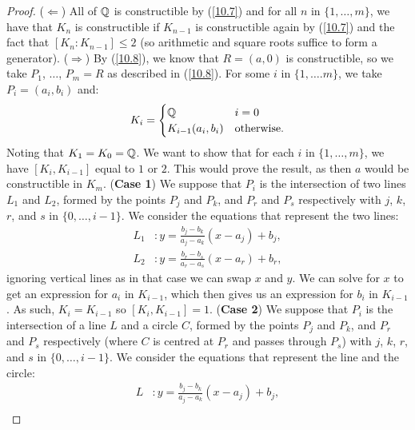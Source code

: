 \begin{proof}
    ($\Longleftarrow$) All of $\mathbb{Q}$ is constructible by (\ref{10.7}) and for all
    $n$ in $\{1, \ldots, m\}$, we have that $K_n$ is constructible if $K_{n - 1}$ is
    constructible again by (\ref{10.7}) and the fact that $[K_n : K_{n - 1}] \leq 2$
    (so arithmetic and square roots suffice to form a generator).
    \bs
    ($\Longrightarrow$) By (\ref{10.8}), we know that $R = (a, 0)$ is constructible,
    so we take $P_1$, $\ldots$, $P_m = R$ as described in (\ref{10.8}). For
    some $i$ in $\{1, \ldots. m\}$, we take $P_i = (a_i, b_i)$ and: \begin{align*}
        K_i = \begin{cases}
            \mathbb{Q}              & i = 0 \\
            K_{i - 1}(a_i, b_i) & \text{otherwise}. \\
        \end{cases}
    \end{align*} Noting that $K_1 = K_0 = \mathbb{Q}$. We want to show that for each
    $i$ in $\{1, \ldots, m\}$, we have $[K_i, K_{i - 1}]$ equal to $1$ or $2$.
    This would prove the result, as then $a$ would be constructible in $K_m$.
    \bs
    (\textbf{Case 1}) We suppose that $P_i$ is the intersection of two lines $L_1$
    and $L_2$, formed by the points $P_j$ and $P_k$, and $P_r$ and $P_s$ respectively
    with $j$, $k$, $r$, and $s$ in $\{0, \ldots, i - 1\}$. We consider the equations
    that represent the two lines: \begin{align*}
        L_1 &: y = \frac{b_j - b_k}{a_j - a_k}(x - a_j) + b_j, \\
        L_2 &: y = \frac{b_r - b_s}{a_r - a_s}(x - a_r) + b_r,
    \end{align*} ignoring vertical lines as in that case we can swap $x$ and $y$. We can
    solve for $x$ to get an expression for $a_i$ in $K_{i - 1}$, which then gives us
    an expression for $b_i$ in $K_{i - 1}$. As such, $K_i = K_{i - 1}$ so
    $[K_i, K_{i - 1}] = 1$.
    \bs
    (\textbf{Case 2}) We suppose that $P_i$ is the intersection of a line $L$ and
    a circle $C$, formed by the points $P_j$ and $P_k$, and $P_r$ and $P_s$ respectively
    (where $C$ is centred at $P_r$ and passes through $P_s$)
    with $j$, $k$, $r$, and $s$ in $\{0, \ldots, i - 1\}$. We consider the equations
    that represent the line and the circle: \begin{align*}
        L &: y = \frac{b_j - b_k}{a_j - a_k}(x - a_j) + b_j, \\

\end{align*}
\end{proof}
